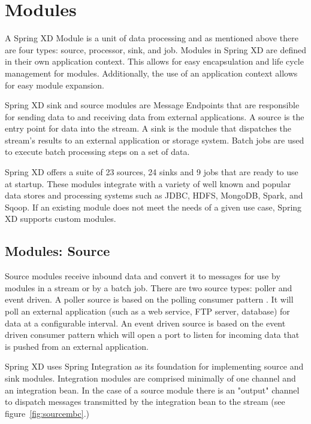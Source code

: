 \section{Modules}
A Spring XD Module is a unit of data processing and as mentioned above there are four 
types: source, processor, sink, and job. Modules in Spring XD are defined in their 
own application context. This allows for easy encapsulation and life cycle management 
for modules. Additionally, the use of an application context allows for easy module 
expansion.

Spring XD sink and source modules are Message Endpoints 
\cite{enterprise-integration-pattern-message-endpoint} 
that are responsible for sending data to and receiving data from external applications.
A source is the entry point for data into the stream. A sink is the module that dispatches
the stream's results to an external application or storage system. Batch jobs are used to
execute batch processing steps on a set of data.

\par

Spring XD offers a suite of 23 sources, 24 sinks and 9 jobs that are ready to use at startup.
These modules integrate with a variety of well known and popular data stores
and processing systems such as JDBC, HDFS, MongoDB, Spark, and Sqoop.
If an existing module does not meet the needs of a given use case, Spring XD supports custom
modules.

\par

\subsection{Modules: Source}
Source modules receive inbound data and convert it to messages for
use by modules in a stream or by a batch job.
There are two source types: poller and event driven.  A poller source is based on the polling
consumer pattern \cite{enterprise-integration-pattern-pollingconsumer}. It
will poll an external application (such as a web service, FTP server, database) for data at a
configurable interval. An event driven source is based on the event driven
consumer pattern \cite{enterprise-integration-pattern-eventdrivenconsumer} which will
open a port to listen for incoming data that is pushed from an external application.

\par

Spring XD uses Spring Integration \cite{spring-integration-reference} as its foundation
for implementing source and sink modules. Integration modules are
comprised minimally of one channel and an integration bean.  In the case of a source module
there is an "output" channel to dispatch messages transmitted by the integration bean to
the stream (see figure~\ref{fig:sourcembc}.)

